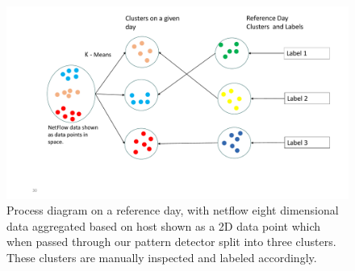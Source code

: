  
 \begin{figure}[t]
 	\centerline{\includegraphics[scale = 0.55]{assign_prob.pdf}}
 	\caption{Process diagram on a reference day, with netflow eight dimensional data aggregated based on host shown as a 2D data point which when passed through our pattern detector split into three clusters. These clusters are manually inspected and labeled accordingly. }%
 \end{figure}

 